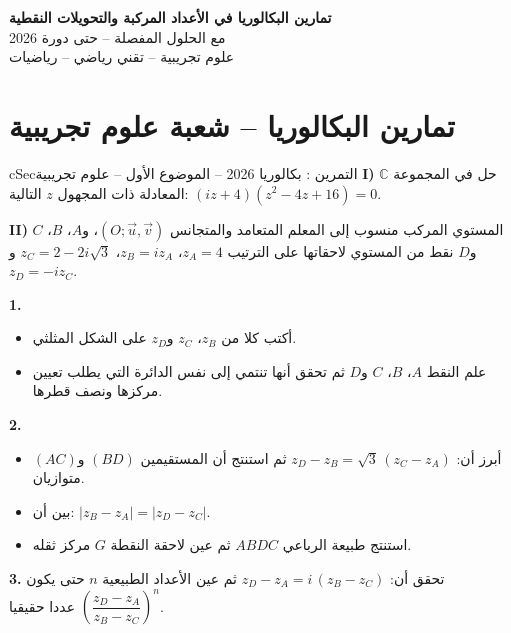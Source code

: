 \documentclass[12pt,a4paper]{article}
\newenvironment{BOX}[2]{\begin{otherlanguage}{english}\begin{arbox}{#1}{#2}}{\end{arbox}\end{otherlanguage}}
\newcounter{exo}
\newenvironment{tamrin}[1]{\stepcounter{exo}\begin{BOX}{cSec}{التمرين \theexo: #1}}{\end{BOX}}
\newenvironment{LTR}{\begin{otherlanguage}{english}}{\end{otherlanguage}}
\newenvironment{sq}{\begin{itemize}[leftmargin=2.4em,itemsep=3pt]}{\end{itemize}}
\newcommand{\qa}{\item[(أ)]}\newcommand{\qb}{\item[(ب)]}\newcommand{\qc}{\item[(جـ)]}\newcommand{\qd}{\item[(د)]}\newcommand{\qe}{\item[(هـ)]}
\newcommand{\QQ}[1]{\par\smallskip\textbf{#1.} }
\begin{document}
\begin{LTR}
\begin{tcolorbox}[enhanced,colback=cSec,colframe=cSec,arc=3mm,halign=center,boxrule=0pt,top=12pt,bottom=12pt,before upper={\selectlanguage{arabic}}]
{\color{white}\fontsize{24}{30}\selectfont\bfseries تمارين البكالوريا في الأعداد المركبة والتحويلات النقطية}\\[8pt]
{\color{white}\large مع الحلول المفصلة -- حتى دورة 2026}\\[5pt]
{\color{white}\large علوم تجريبية -- تقني رياضي -- رياضيات}
\end{tcolorbox}
\end{LTR}
\section{تمارين البكالوريا -- شعبة علوم تجريبية}
\begin{tamrin}{بكالوريا 2026 -- الموضوع الأول -- علوم تجريبية}
\textbf{I)} حل في المجموعة $\mathbb{C}$ المعادلة ذات المجهول $z$ التالية: $(iz+4)(z^2-4z+16)=0$.

\textbf{II)} المستوي المركب منسوب إلى المعلم المتعامد والمتجانس $(O;\vec u,\vec v)$، و$A$، $B$، $C$ و$D$ نقط من المستوي لاحقاتها على الترتيب $z_A=4$، $z_B=iz_A$، $z_C=2-2i\sqrt3$ و$z_D=-iz_C$.
\QQ{1}
\begin{sq}
\qa أكتب كلا من $z_B$، $z_C$ و$z_D$ على الشكل المثلثي.
\qb علم النقط $A$، $B$، $C$ و$D$ ثم تحقق أنها تنتمي إلى نفس الدائرة التي يطلب تعيين مركزها ونصف قطرها.
\end{sq}
\QQ{2}
\begin{sq}
\qa أبرز أن: $z_D-z_B=\sqrt3\,(z_C-z_A)$ ثم استنتج أن المستقيمين $(BD)$ و$(AC)$ متوازيان.
\qb بين أن: $|z_B-z_A|=|z_D-z_C|$.
\qc استنتج طبيعة الرباعي $ABDC$ ثم عين لاحقة النقطة $G$ مركز ثقله.
\end{sq}
\QQ{3} تحقق أن: $z_D-z_A=i\,(z_B-z_C)$ ثم عين الأعداد الطبيعية $n$ حتى يكون $\left(\dfrac{z_D-z_A}{z_B-z_C}\right)^{n}$ عددا حقيقيا.
\end{tamrin}
\end{document}
